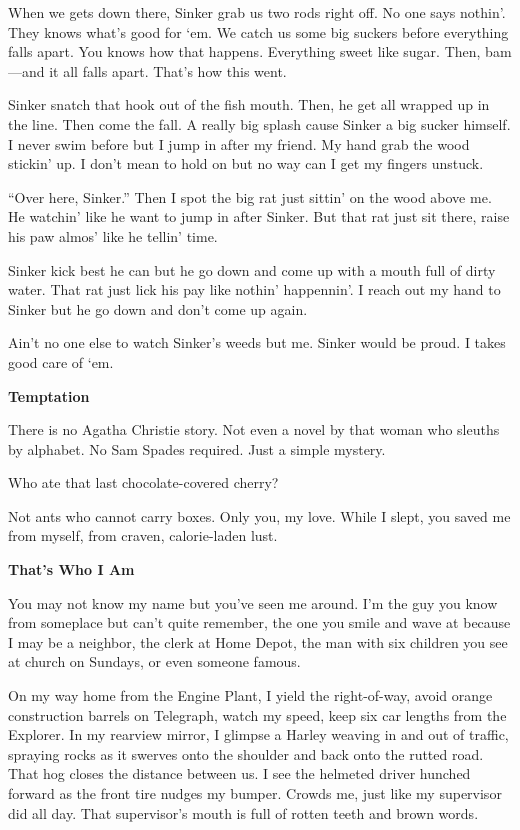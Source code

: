 \documentclass[
]{article}
\begin{document}
When we gets down there, Sinker grab us two rods right off. No one says
nothin'. They knows what's good for `em. We catch us some big suckers
before everything falls apart. You knows how that happens. Everything
sweet like sugar. Then, bam---and it all falls apart. That's how this
went.

Sinker snatch that hook out of the fish mouth. Then, he get all wrapped
up in the line. Then come the fall. A really big splash cause Sinker a
big sucker himself. I never swim before but I jump in after my friend.
My hand grab the wood stickin' up. I don't mean to hold on but no way
can I get my fingers unstuck.

``Over here, Sinker.'' Then I spot the big rat just sittin' on the wood
above me. He watchin' like he want to jump in after Sinker. But that rat
just sit there, raise his paw almos' like he tellin' time.

Sinker kick best he can but he go down and come up with a mouth full of
dirty water. That rat just lick his pay like nothin' happennin'. I reach
out my hand to Sinker but he go down and don't come up again.

Ain't no one else to watch Sinker's weeds but me. Sinker would be proud.
I takes good care of `em.

\textbf{\hfill\break
}

\textbf{Temptation}

There is no Agatha Christie story. Not even a novel by that woman who
sleuths by alphabet. No Sam Spades required. Just a simple mystery.

Who ate that last chocolate-covered cherry?

Not ants who cannot carry boxes. Only you, my love. While I slept, you
saved me from myself, from craven, calorie-laden lust.

\textbf{\hfill\break
}

\textbf{That's Who I Am}

You may not know my name but you've seen me around. I'm the guy you know
from some­place but can't quite remember, the one you smile and wave at
because I may be a neighbor, the clerk at Home Depot, the man with six
children you see at church on Sundays, or even someone famous.

On my way home from the Engine Plant, I yield the right-of-way, avoid
orange construction barrels on Telegraph, watch my speed, keep six car
lengths from the Explorer. In my rearview mirror, I glimpse a Harley
weaving in and out of traffic, spraying rocks as it swerves onto the
shoulder and back onto the rutted road. That hog closes the distance
between us. I see the helmeted driver hunched forward as the front tire
nudges my bumper. Crowds me, just like my supervisor did all day. That
supervisor's mouth is full of rotten teeth and brown words.
\end{document}
